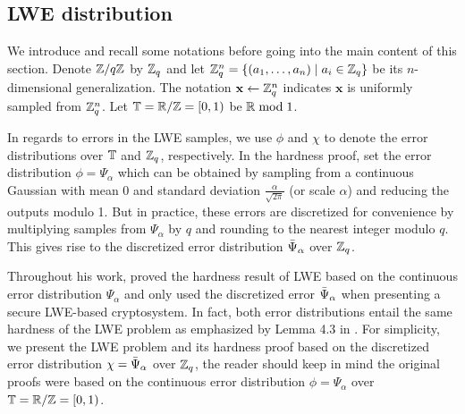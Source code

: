\documentclass[../main.tex]{subfiles}
\begin{document}


\subsection{LWE distribution}
\label{subsec:lweDist}

We introduce and recall some notations before going into the main content of this section. Denote $\mathbb{Z} / q\mathbb{Z}$ by $\mathbb{Z}_q$ and let $\mathbb{Z}_q^n = \{( a_1, \dots, a_n) \mid a_i \in \mathbb{Z}_q\}$ be its $n$-dimensional generalization. 
The notation $\mathbf{x} \leftarrow \mathbb{Z}_q^n$ indicates $\mathbf{x}$ is uniformly sampled from $\mathbb{Z}_q^n$. 
Let $\mathbb{T}=\mathbb{R}/\mathbb{Z}=[0,1)$ be $\mathbb{R} \bmod 1$.

In regards to errors in the LWE samples, we use $\phi$ and $\chi$ to denote the error distributions over $\mathbb{T}$ and $\mathbb{Z}_q$, respectively. In the hardness proof, \cite{regev2009lattices} set the error distribution $\phi=\Psi_{\alpha}$ which can be obtained by sampling from a continuous Gaussian with mean 0 and standard deviation $\frac{\alpha}{\sqrt{2\pi}}$ (or scale $\alpha$) and reducing the outputs modulo 1. But in practice, these errors are discretized for convenience by multiplying samples from $\Psi_{\alpha}$ by $q$ and rounding to the nearest integer modulo $q$. This gives rise to the discretized error distribution $\Bar{\Psi}_{\alpha}$ over $\mathbb{Z}_q$. 

Throughout his work, \citep{regev2009lattices} proved the hardness result of LWE based on the continuous error distribution $\Psi_{\alpha}$ and only used the discretized error $\Bar{\Psi}_{\alpha}$ when presenting a secure LWE-based cryptosystem. In fact, both error distributions entail the same hardness of the LWE problem as emphasized by Lemma 4.3 in \citep{regev2009lattices}. For simplicity, we present the LWE problem and its hardness proof based on the discretized error distribution $\chi=\Bar{\Psi}_{\alpha}$ over $\mathbb{Z}_q$, the reader should keep in mind the original proofs were based on the continuous error distribution $\phi=\Psi_{\alpha}$ over $\mathbb{T}=\mathbb{R}/\mathbb{Z}=[0,1)$.
\end{document}
